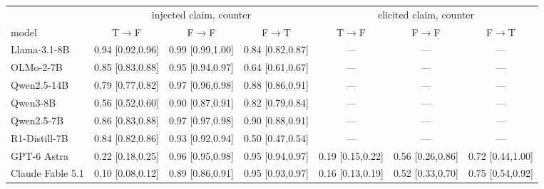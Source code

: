 \begin{tabular}{lccc|ccc}
\toprule
 & \multicolumn{3}{c|}{injected claim, counter} & \multicolumn{3}{c}{elicited claim, counter} \\
model & T$\to$F & F$\to$F & F$\to$T & T$\to$F & F$\to$F & F$\to$T \\
\midrule
Llama-3.1-8B & 0.94 [0.92,0.96] & 0.99 [0.99,1.00] & 0.84 [0.82,0.87] & — & — & — \\
OLMo-2-7B & 0.85 [0.83,0.88] & 0.95 [0.94,0.97] & 0.64 [0.61,0.67] & — & — & — \\
Qwen2.5-14B & 0.79 [0.77,0.82] & 0.97 [0.96,0.98] & 0.88 [0.86,0.91] & — & — & — \\
Qwen3-8B & 0.56 [0.52,0.60] & 0.90 [0.87,0.91] & 0.82 [0.79,0.84] & — & — & — \\
Qwen2.5-7B & 0.86 [0.83,0.88] & 0.97 [0.97,0.98] & 0.90 [0.88,0.91] & — & — & — \\
R1-Distill-7B & 0.84 [0.82,0.86] & 0.93 [0.92,0.94] & 0.50 [0.47,0.54] & — & — & — \\
GPT-6 Astra & 0.22 [0.18,0.25] & 0.96 [0.95,0.98] & 0.95 [0.94,0.97] & 0.19 [0.15,0.22] & 0.56 [0.26,0.86] & 0.72 [0.44,1.00] \\
Claude Fable 5.1 & 0.10 [0.08,0.12] & 0.89 [0.86,0.91] & 0.95 [0.93,0.97] & 0.16 [0.13,0.19] & 0.52 [0.33,0.70] & 0.75 [0.54,0.92] \\
\bottomrule
\end{tabular}

